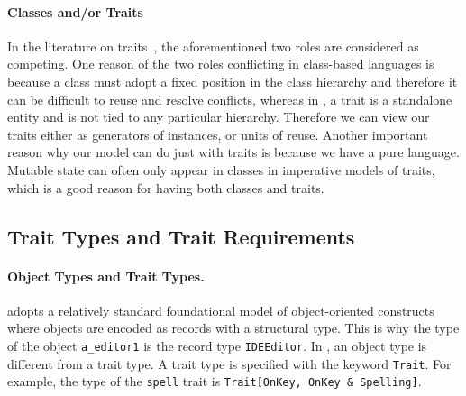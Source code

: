 \paragraph{Classes and/or Traits}

In the literature on traits~\cite{Ducasse_2006, scharli2003traits}, the
aforementioned two roles are considered as competing. One reason of the two
roles conflicting in class-based languages is because a class must adopt a fixed
position in the class hierarchy and therefore it can be difficult to reuse and
resolve conflicts, whereas in \name, a trait is a standalone entity and is not
tied to any particular hierarchy. Therefore we can view our traits either as
generators of instances, or units of reuse. Another important reason why our
model can do just with traits is because we have a pure language. Mutable state
can often only appear in classes in imperative models of traits, which is a good
reason for having both classes and traits.





\subsection{Trait Types and Trait Requirements}

\paragraph{Object Types and Trait Types.}
\name adopts a relatively standard foundational model of object-oriented
constructs~\cite{DBLP:conf/ecoop/LeeASP15} where objects are encoded as records
with a structural type. This is why the type of the object \lstinline{a_editor1}
is the record type \lstinline{IDEEditor}. In \name, an object type is
different from a trait type. A trait type is specified with the keyword
\lstinline{Trait}. For example, the type of the \lstinline{spell} trait is
\lstinline{Trait[OnKey, OnKey & Spelling]}. 

